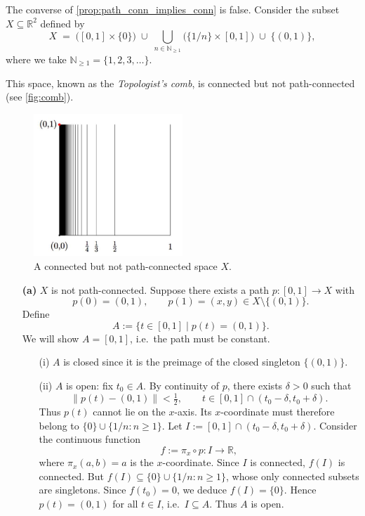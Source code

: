 \begin{example}
\label{ex:topologist_comb}
The converse of \autoref{prop:path_conn_implies_conn} is false.  
Consider the subset \(X \subseteq \mathbb{R}^2\) defined by
\[
X \;=\; 
\bigl( [0,1] \times \{0\} \bigr) 
\;\cup\; 
\bigcup_{n \in \mathbb{N}_{\geq 1}} \bigl( \{1/n\} \times [0,1] \bigr) 
\;\cup\; 
\{(0,1)\},
\]
where we take \(\mathbb{N}_{\geq 1} = \{1,2,3,\dots\}\).

This space, known as the \emph{Topologist's comb}, is connected but not path-connected
(see \autoref{fig:comb}).

\begin{figure}[h!]
\centering
\includegraphics[width=0.5\textwidth]{images/Ch3_topologists_comb.jpg}
\caption{A connected but not path-connected space \(X\).}
\label{fig:comb}
\end{figure}

\begin{enumerate}
\item[\textbf{(a)}] 
\(X\) is not path-connected.  
Suppose there exists a path \(p : [0,1] \to X\) with
\[
p(0) = (0,1), \qquad p(1) = (x,y) \in X \setminus \{(0,1)\}.
\]
Define
\[
A := \{ t \in [0,1] \mid p(t) = (0,1) \}.
\]
We will show \(A = [0,1]\), i.e.\ the path must be constant.

\begin{enumerate}
\item[(i)] \(A\) is closed since it is the preimage of the closed singleton \(\{(0,1)\}\).  
\item[(ii)] \(A\) is open: fix \(t_0 \in A\). By continuity of \(p\), there exists \(\delta > 0\) such that
\[
\|p(t) - (0,1)\| < \tfrac{1}{2},
\qquad 
t \in [0,1] \cap (t_0 - \delta, t_0 + \delta).
\]
Thus \(p(t)\) cannot lie on the $x$-axis. Its $x$-coordinate must therefore belong to
\(\{0\} \cup \{1/n : n \geq 1\}\).  
Let \(I := [0,1] \cap (t_0 - \delta, t_0 + \delta)\). Consider the continuous function
\[
f := \pi_x \circ p : I \to \mathbb{R},
\]
where \(\pi_x(a,b) = a\) is the $x$-coordinate. Since \(I\) is connected, \(f(I)\) is connected.  
But \(f(I) \subseteq \{0\} \cup \{1/n : n \geq 1\}\), whose only connected subsets are singletons.  
Since \(f(t_0) = 0\), we deduce \(f(I) = \{0\}\). Hence \(p(t) = (0,1)\) for all \(t \in I\), i.e.\ \(I \subseteq A\).  
Thus \(A\) is open.
\end{enumerate}


\end{enumerate}
\end{example}
